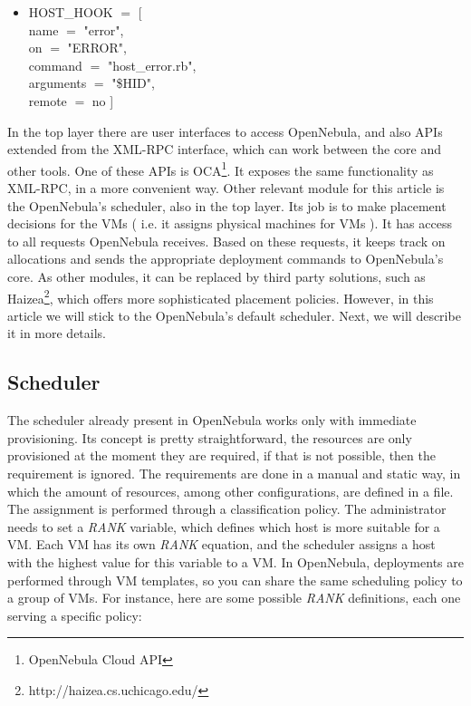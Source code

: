 \documentclass[jidm,a4paper]{jidm} %
\begin{document}
\begin{itemize}
 \item HOST\_HOOK $=$ [ \\
    name      $=$ "error",\\
    on        $=$ "ERROR",\\
    command   $=$ "host\_error.rb",\\
    arguments $=$ "\$HID",\\
    remote    $=$ no ]\\
\end{itemize}

In the top layer there are user interfaces to access OpenNebula, and also APIs extended from the XML-RPC interface, which can work between the core and other tools. One of these APIs is  OCA\footnote{OpenNebula Cloud API}. It exposes the same functionality as XML-RPC, in a more convenient way. Other relevant module for this article is the OpenNebula's scheduler, also in the top layer. Its job is to make placement decisions for the VMs ( i.e. it assigns physical machines for VMs ). It has access to all requests OpenNebula receives. Based on these requests, it keeps track on allocations and sends the appropriate deployment commands to OpenNebula's core. As other modules, it can be replaced by third party solutions, such as Haizea\footnote{http://haizea.cs.uchicago.edu/},  which offers more sophisticated placement policies. However, in this article we will stick to the OpenNebula's default scheduler. Next, we will describe it in more details.

\subsection{Scheduler}

The scheduler already present in OpenNebula works only with immediate provisioning. Its concept is pretty straightforward, the resources are only provisioned at the moment they are required, if that is not possible, then the requirement is ignored. The requirements are done in a manual and static way, in which the amount of resources, among other configurations, are defined in a file. The assignment is performed through a classification policy.  The administrator needs to set a \textit{RANK} variable, which defines which host is more suitable for a VM. Each VM has its own \textit{RANK} equation, and the scheduler assigns a host with the highest value for this variable to a VM. In OpenNebula, deployments are performed through VM templates, so you can share the same scheduling policy  to a group of VMs. For instance, here are some possible \textit{RANK} definitions, each one serving a specific policy:
\end{document}
